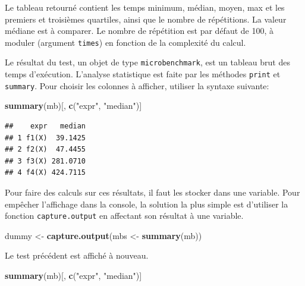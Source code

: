 \documentclass[
  12pt,
  french,
  a4paper,
  extrafontsizes,onecolumn,openright
  ]{memoir}
\newenvironment{Shaded}{\begin{snugshade}}{\end{snugshade}}
\newcommand{\KeywordTok}[1]{\textcolor[rgb]{0.13,0.29,0.53}{\textbf{#1}}}
\newcommand{\NormalTok}[1]{#1}
\newcommand{\StringTok}[1]{\textcolor[rgb]{0.31,0.60,0.02}{#1}}
\begin{document}
Le tableau retourné contient les temps minimum, médian, moyen, max et les premiers et troisièmes quartiles, ainsi que le nombre de répétitions.
La valeur médiane est à comparer.
Le nombre de répétition est par défaut de 100, à moduler (argument \texttt{times}) en fonction de la complexité du calcul.

Le résultat du test, un objet de type \texttt{microbenchmark}, est un tableau brut des temps d'exécution.
L'analyse statistique est faite par les méthodes \texttt{print} et \texttt{summary}.
Pour choisir les colonnes à afficher, utiliser la syntaxe suivante:

\scriptsize

\begin{Shaded}
\begin{Highlighting}[]
\KeywordTok{summary}\NormalTok{(mb)[, }\KeywordTok{c}\NormalTok{(}\StringTok{"expr"}\NormalTok{, }\StringTok{"median"}\NormalTok{)]}
\end{Highlighting}
\end{Shaded}

\begin{verbatim}
##    expr   median
## 1 f1(X)  39.1425
## 2 f2(X)  47.4455
## 3 f3(X) 281.0710
## 4 f4(X) 424.7115
\end{verbatim}

\normalsize

Pour faire des calculs sur ces résultats, il faut les stocker dans une variable.
Pour empêcher l'affichage dans la console, la solution la plus simple est d'utiliser la fonction \texttt{capture.output} en affectant son résultat à une variable.

\scriptsize

\begin{Shaded}
\begin{Highlighting}[]
\NormalTok{dummy <-}\StringTok{ }\KeywordTok{capture.output}\NormalTok{(mbs <-}\StringTok{ }\KeywordTok{summary}\NormalTok{(mb))}
\end{Highlighting}
\end{Shaded}

\normalsize

Le test précédent est affiché à nouveau.

\scriptsize

\begin{Shaded}
\begin{Highlighting}[]
\KeywordTok{summary}\NormalTok{(mb)[, }\KeywordTok{c}\NormalTok{(}\StringTok{"expr"}\NormalTok{, }\StringTok{"median"}\NormalTok{)]}
\end{Highlighting}
\end{Shaded}
\end{document}
